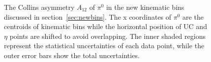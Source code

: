 \begin{figure}[H]
  \centering     
\caption{The Collins asymmetry $A_{12}$ of $\pi^0$ in the new kinematic bins discussed in section~\ref{sec:newbins}. The x coordinates of $\pi^0$ are the centroids of kinematic bins while the horizontal position of UC and $\eta$ points are shifted to avoid overlapping. The inner shaded regions represent the statistical uncertainties of each data point, while the outer error bars show the total uncertainties.}
\label{fig:finalasymmetry3}
\end{figure}
